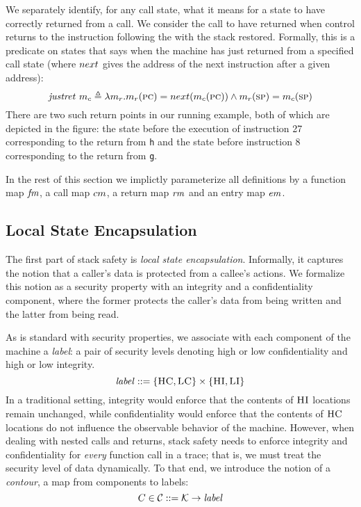 \documentclass[acmsmall,review,anonymous]{acmart}\settopmatter{printfolios=true,printccs=false,printacmref=false}
\begin{document}
We separately identify, for any call state, what it means for a state
to have correctly returned from a call. We consider the call to have
returned when control returns to the instruction following
the \jal with the stack restored. Formally, this is a predicate on
states that says when the machine has just returned from a specified call state
(where $next$ gives the address of the next instruction after a given address):
\[%
    \ret{\mach_c} \triangleq  \lambda \mach_r . \mach_r(\PCname) =
    \nextPC(\mach_c(\PCname)) \land  \mach_r(\SP) = \mach_c(\SP)
\]
There are two such return points in our running example, both of which
are depicted in the figure: the state before the execution of
instruction 27 corresponding to the return from {\tt h} and the state
before instruction 8 corresponding to the return from {\tt g}.

\medskip

In the rest of this section we implictly parameterize all
definitions by a function map $\mathit{fm}$, a call map $cm$, a return
map $\mathit{rm}$ and an entry map $\mathit{em}$.

\subsection{Local State Encapsulation}
\label{sec:lse}

The first part of stack safety is {\em local state encapsulation}.
Informally, it captures the notion that a caller's data is
protected from a callee's actions. We formalize this notion
as a security property with an integrity and a confidentiality
component, where the former protects the caller's data from being
written and the latter from being read.

As is standard with security properties, we associate with each
component of the machine a {\em label}: a pair of security levels
denoting high or low confidentiality and high or low integrity.
%
\[\mathit{label} ::= \{\textsc{HC},\textsc{LC}\} \times \{\textsc{HI},\textsc{LI}\}\]
%
In a traditional setting, integrity would enforce that the contents of
$\textsc{HI}$ locations remain unchanged, while confidentiality would
enforce that the contents of $\textsc{HC}$ locations do not influence the
observable behavior of the machine. However, when dealing with nested
calls and returns, stack safety needs to enforce integrity and
confidentiality for {\em every} function call in a trace; that is, we
must treat the security level of data dynamically.
%
To that end, we introduce the notion of a {\em contour}, a map from
components to labels:
%
\[C \in {\mathcal C} ::= {\mathcal K} \rightarrow \mathit{label}\]
\end{document}
